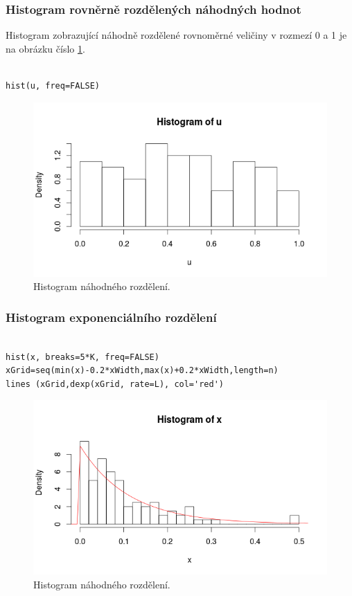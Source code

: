 \documentclass[12pt]{article}
\begin{document}
\subsubsection{Histogram rovněrně rozdělených náhodných hodnot}
\begin{footnotesize}
\color{black}
Histogram zobrazující náhodně rozdělené rovnoměrné veličiny v rozmezí 0 a 1 je na obrázku číslo \ref{obr:histogram_u}.
\end{footnotesize}
\begin{lstlisting}[frame=single]  % Start your code-block
    
hist(u, freq=FALSE)
\end{lstlisting}
\begin{figure}[h!t]
	\includegraphics[scale=0.5]{img/histogram_u}\centering
	\caption{Histogram náhodného rozdělení.}
	\label{obr:histogram_u}
\end{figure}

\subsubsection{Histogram exponenciálního rozdělení}
  \begin{lstlisting}[frame=single]  % Start your code-block
  	
hist(x, breaks=5*K, freq=FALSE)
xGrid=seq(min(x)-0.2*xWidth,max(x)+0.2*xWidth,length=n) 
lines (xGrid,dexp(xGrid, rate=L), col='red') 
\end{lstlisting}
\begin{figure}[ht!]
	\includegraphics[scale=0.5]{img/histogram_x}\centering
	\caption{Histogram náhodného rozdělení.}
	\label{obr:sikme}
\end{figure}
\end{document}
